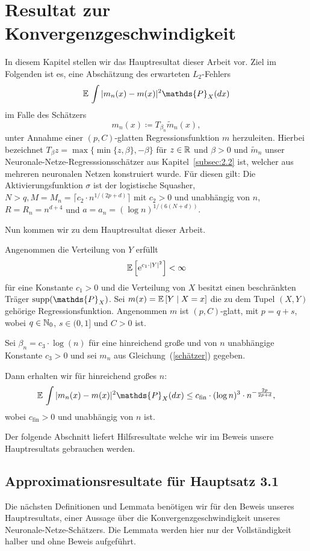 \chapter{Resultat zur Konvergenzgeschwindigkeit}
\label{chap:3}

In diesem Kapitel stellen wir das Hauptresultat dieser Arbeit vor.
Ziel im Folgenden ist es, eine Abschätzung des erwarteten $L_2$-Fehlers 
$$\E \int |m_n(x) - m(x)|^2  \mathds{P}_X(dx)$$
im Falle des Schätzers 
\begin{equation}
\label{schätzer}
m_n(x) \coloneqq T_{\beta_n}\tilde{m}_n (x),
\end{equation}
unter Annahme einer $(p,C)$-glatten Regressionsfunktion $m$ herzuleiten. Hierbei bezeichnet $T_{\beta}z = \max\{\min\{z, \beta\}, -\beta\}$
für $z \in \mathbb{R}$ und $\beta > 0$ und $\tilde{m}_n$ unser Neuronale-Netze-Regresssionsschätzer aus Kapitel~\ref{subsec:2.2} ist, welcher aus mehreren neuronalen Netzen konstruiert wurde. Für diesen gilt: 
Die Aktivierungsfunktion $\sigma$ ist der logistische Squasher, $N > q, M = M_n = \lceil c_2 \cdot n^{1/(2p + d)}\rceil$ mit $c_2 >0$ und unabhängig von $n$, $R = R_n = n^{d + 4}$ und $a = a_n = (\log n)^{1/(6(N + d))}.$

Nun kommen wir zu dem Hauptresultat dieser Arbeit.
\begin{mthm}
\label{optstop}
Angenommen die Verteilung von $Y$ erfüllt 
$$ \mathbb{E}\,\Big[\mathrm{e}^{c_1 \cdot |Y|^2}\Big] < \infty$$
für eine Konstante $c_1 > 0$ und die Verteilung von $X$ besitzt einen beschränkten Träger $\supp(\mathds{P}_X)$. Sei $m(x) = \mathbb{E}\,[Y \mid X = x]$ die zu dem Tupel $(X, Y)$ gehörige Regressionsfunktion.
Angenommen $m$ ist $(p,C)$-glatt, mit $p = q + s$, wobei $q \in \mathbb{N}_0$, $s \in (0,1]$ und $C > 0$ ist.

Sei $\beta_n = c_3 \cdot \log(n)$ für eine hinreichend große und von $n$ unabhängige Konstante $c_3 > 0$ und sei $m_n$ aus Gleichung~(\ref{schätzer}) gegeben.

Dann erhalten wir für hinreichend großes $n$:
$$\E \int |m_n(x) - m(x)|^2  \mathds{P}_X(dx) \leq c_{\mathrm{fin}} \cdot (\log n)^3 \cdot n^{- \frac{2p}{2p + d}},$$
wobei $c_{\mathrm{fin}} > 0$ und unabhängig von $n$ ist.
\end{mthm}

Der folgende Abschnitt liefert Hilfsresultate welche wir im Beweis unsere Hauptresultats gebrauchen werden.

\section{Approximationsresultate für Hauptsatz 3.1}
Die nächsten  Definitionen und Lemmata benötigen wir für den Beweis unseres Hauptresultats, einer Aussage über die Konvergenzgeschwindigkeit unseres Neuronale-Netze-Schätzers. Die Lemmata werden hier nur der Vollständigkeit halber und ohne Beweis aufgeführt. 

